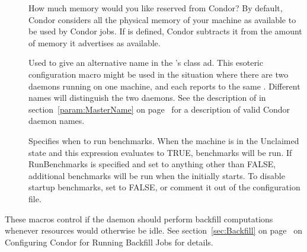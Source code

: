 \begin{description}
\item[] \label{param:ReservedMemory}
  How much memory would you like reserved from Condor?  By default,
  Condor considers all the physical memory of your machine as
  available to be used by Condor jobs.  If  is
  defined, Condor subtracts it from the amount of memory it advertises
  as available.

\item[] \label{param:StartdName}
  Used to give an alternative name in the 's
  class ad.
  This esoteric configuration macro might be used in the situation
  where there are two  daemons running on one machine,
  and each reports to the same .
  Different names will distinguish the two daemons.
  See the description of  in
  section~\ref{param:MasterName} on page~\pageref{param:MasterName}
  for a description of valid Condor daemon names.

\item[] \label{param:RunBenchmarks}
  Specifies when to run benchmarks.
  When the machine is in the Unclaimed state and this expression
  evaluates to TRUE, benchmarks will be run.
  If RunBenchmarks is specified and set to anything other than FALSE,
  additional benchmarks will be run when the  initially starts.
  To disable startup benchmarks, set  to FALSE,
  or comment it out of the configuration file.

\end{description}

These macros control if the  daemon should perform
backfill computations whenever resources would otherwise be idle.  
See section~\ref{sec:Backfill} on page~\pageref{sec:Backfill} on
Configuring Condor for Running Backfill Jobs for details.

